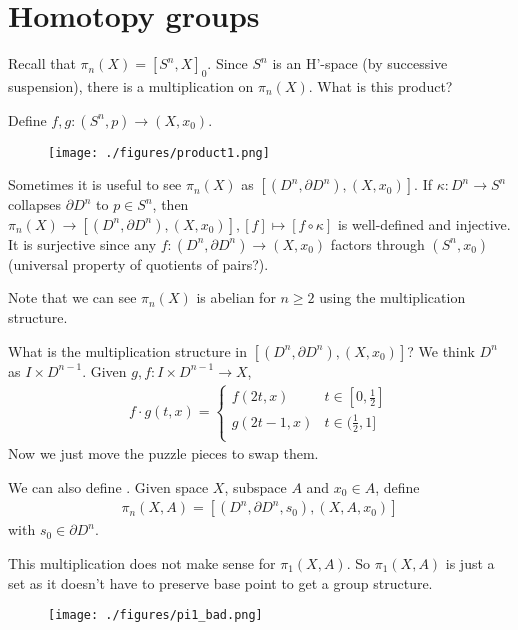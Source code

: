\documentclass[12pt,class=article,crop=false]{standalone}
\begin{document}
\section{Homotopy groups}
Recall that $ \pi_n(X) = [S^{n}, X]_0$. Since $ S^{n}$ is an H'-space (by successive suspension), there is a multiplication on $ \pi_n(X)$. What is this product?

Define $ f,g:(S^{n},p) \to (X,x_0)$.
~\begin{figure}[H]
	\centering
	\texttt{[image: ./figures/product1.png]}
\end{figure}

Sometimes it is useful to see $ \pi_n(X)$ as $ [(D^{n}, \partial D^{n}),(X,x_0)]$. If $ \kappa: D^{n} \to S^{n}$ collapses $ \partial D^{n}$ to $ p \in S^{n}$, then  $\pi_n(X) \to [(D^{n},\partial D^{n}),(X,x_0)], [f] \mapsto [f \circ \kappa ]$ is well-defined and injective. It is surjective since any $ f:(D^{n},\partial D^{n}) \to (X,x_0)$ factors through $ (S^{n},x_0)$ (universal property of quotients of pairs?).

Note that we can see $ \pi_n(X)$ is abelian for $ n \geq 2$ using the multiplication structure.

What is the multiplication structure in $ [(D^{n} , \partial D^{n}),(X,x_0)]$? We think $ D^{n}$ as $ I \times D^{n-1}$. Given  $ g,f: I \times D^{n-1} \to X$,
\begin{align*}
	f \cdot g(t,x) = \begin{cases}
		f(2t,x) & t \in [0, \frac{1}{2}]\\
		g(2t-1,x) & t \in (\frac{1}{2},1]\\
	\end{cases}
\end{align*}
Now we just move the puzzle pieces to swap them.

\begin{defn}
	We can also define .
Given space $ X$, subspace  $ A$ and  $ x_0 \in A$, define
\begin{align*}
	\pi_n(X,A) = [(D^{n}, \partial D^{n},s_0),(X,A,x_0)]
\end{align*}
with $ s_0 \in \partial D^{n}$.
\end{defn}

This multiplication does not make sense for $ \pi_1(X,A)$. So $ \pi_1(X,A)$ is just a set as it doesn't have to preserve base point to get a group structure.
~\begin{figure}[H]
	\centering
	\texttt{[image: ./figures/pi1\_bad.png]}
\end{figure}
\end{document}
